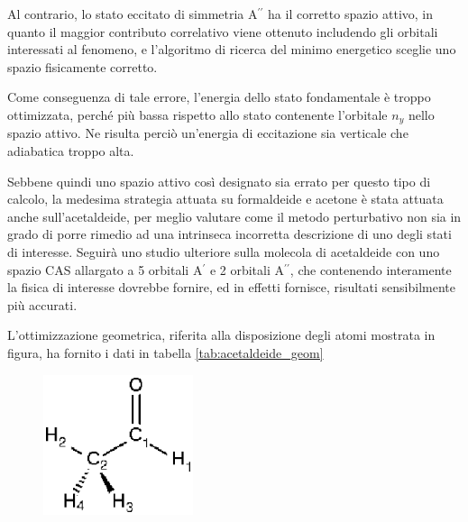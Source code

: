 Al contrario, lo stato eccitato di simmetria A$^{\prime\prime}$ ha il
corretto spazio attivo, in quanto il maggior contributo correlativo viene
ottenuto includendo gli orbitali interessati al fenomeno, e l'algoritmo
di ricerca del minimo energetico sceglie uno spazio fisicamente corretto.

Come conseguenza di tale errore, l'energia dello stato fondamentale \`e
troppo ottimizzata, perch\'e pi\`u bassa rispetto allo stato contenente
l'orbitale $n_y$ nello spazio attivo. Ne risulta perci\`o un'energia di
eccitazione sia verticale che adiabatica troppo alta.

Sebbene quindi uno spazio attivo cos\`i designato sia errato per questo tipo
di calcolo, la medesima strategia attuata su formaldeide e acetone \`e stata
attuata anche sull'acetaldeide, per meglio valutare come il metodo
perturbativo non sia in grado di porre rimedio ad una intrinseca incorretta
descrizione di uno degli stati di interesse. 
Seguir\`a uno studio ulteriore sulla molecola di
acetaldeide con uno spazio CAS allargato a 5 orbitali A$^{\prime}$ e 2
orbitali A$^{\prime\prime}$, che contenendo interamente la fisica di
interesse dovrebbe fornire, ed in effetti fornisce, risultati sensibilmente
pi\`u accurati.

L'ottimizzazione geometrica, riferita alla disposizione degli atomi mostrata
in figura, ha fornito i dati in tabella \ref{tab:acetaldeide_geom}

\begin{figure}[ht]
\begin{center}
\includegraphics[angle=0,width=44mm,keepaspectratio]{immagini/acetaldeide/2d.eps}
\label{fig:acetaldeide_2d}
\end{center}
\end{figure}

